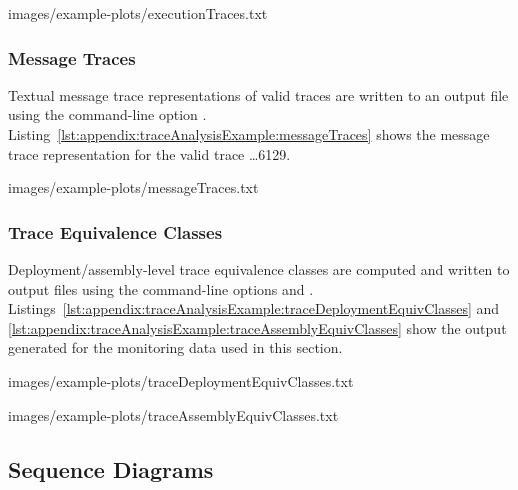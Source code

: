 \setTextListing
%
{images/example-plots/executionTraces.txt}

\subsubsection{Message Traces}\label{sec:example:messageTraces}%

Textual message trace representations of valid traces are written to an output %
file using the command-line option \OPT{\OPTprintMessageTraces}. %
Listing~\ref{lst:appendix:traceAnalysisExample:messageTraces} %
shows the message trace representation for the valid trace \ldots6129.

\setTextListing
%
{images/example-plots/messageTraces.txt}

\subsubsection{Trace Equivalence Classes}\label{sec:example:traceEquivClasses}%

Deployment/assembly-level trace equivalence classes are computed and written %
to output files using the command-line options \OPT{\OPTprintDeploymentEquivalenceClasses} %
and \OPT{\OPTprintAssemblyEquivalenceClasses}. %
Listings~\ref{lst:appendix:traceAnalysisExample:traceDeploymentEquivClasses} and %
\ref{lst:appendix:traceAnalysisExample:traceAssemblyEquivClasses} show the %
output generated for the monitoring data used in this section. %

\setTextListing

{images/example-plots/traceDeploymentEquivClasses.txt}

\setTextListing
%
{images/example-plots/traceAssemblyEquivClasses.txt}

\subsection{Sequence Diagrams}\label{sec:example:seqDiagrams}%


